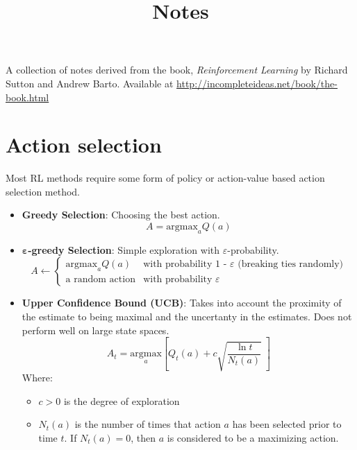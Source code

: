 \documentclass[12pt]{article}
\title{Notes}
\begin{document}
\maketitle
A collection of notes derived from the book, 
\textit{Reinforcement Learning} by Richard Sutton and Andrew Barto.
Available at \url{http://incompleteideas.net/book/the-book.html}

\section{Action selection}
Most RL methods require some form of policy or action-value based action selection method.
\begin{itemize}
\item\textbf{Greedy Selection}: Choosing the best action.
\[A = \text{argmax}_aQ(a) \]

\item$\boldsymbol\varepsilon$\textbf{-greedy Selection}: Simple exploration with $\varepsilon$-probability.
\[
	A\leftarrow
	\begin{cases}
		\text{argmax}_aQ(a) & \text{with probability 1 - $\varepsilon$ (breaking ties randomly)} \\
		\text{a random action} & \text{with probability } \varepsilon
	\end{cases}
\]
\item\textbf{Upper Confidence Bound (UCB)}: Takes into account the proximity of the estimate to being maximal and the uncertanty in the estimates. Does not perform well on large state spaces.
\[
	A_t=\underset{a}{\text{argmax}} 
	\left[
		Q_t(a) + c \sqrt{\frac{\ln{t}}{N_t(a)}}\;
	\right]
\]
Where:
	\begin{itemize}
		\item $c > 0$ is the degree of exploration
		\item $N_t(a)$ is the number of times that action $a$ has been selected prior to time $t$.
			If $N_t(a)=0$, then $a$ is considered to be a maximizing action.
	\end{itemize}
\end{itemize}
\end{document}
